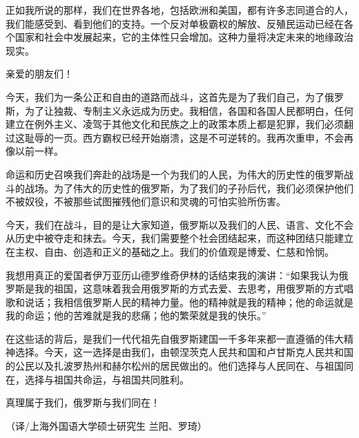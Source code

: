 \documentclass[UTF8, 11pt, oneside]{ctexart}
\begin{document}
正如我所说的那样，我们在世界各地，包括欧洲和美国，都有许多志同道合的人，我们能感受到、看到他们的支持。一个反对单极霸权的解放、反殖民运动已经在各个国家和社会中发展起来，它的主体性只会增加。这种力量将决定未来的地缘政治现实。

亲爱的朋友们！

今天，我们为一条公正和自由的道路而战斗，这首先是为了我们自己，为了俄罗斯，为了让独裁、专制主义永远成为历史。我相信，各国和各国人民都明白，任何建立在例外主义、凌驾于其他文化和民族之上的政策本质上都是犯罪，我们必须翻过这耻辱的一页。西方霸权已经开始崩溃，这是不可逆转的。我再次重申，不会再像以前一样。

命运和历史召唤我们奔赴的战场是一个为我们的人民，为伟大的历史性的俄罗斯战斗的战场。为了伟大的历史性的俄罗斯，为了我们的子孙后代，我们必须保护他们不被奴役，不被那些试图摧残他们意识和灵魂的可怕实验所伤害。

今天，我们在战斗，目的是让大家知道，俄罗斯以及我们的人民、语言、文化不会从历史中被夺走和抹去。今天，我们需要整个社会团结起来，而这种团结只能建立在主权、自由、创造和正义的基础之上。我们的价值观是博爱、仁慈和怜悯。

我想用真正的爱国者伊万亚历山德罗维奇伊林的话结束我的演讲：“如果我认为俄罗斯是我的祖国，这意味着我会用俄罗斯的方式去爱、去思考，用俄罗斯的方式唱歌和说话；我相信俄罗斯人民的精神力量。他的精神就是我的精神；他的命运就是我的命运；他的苦难就是我的悲痛；他的繁荣就是我的快乐。”

在这些话的背后，是我们一代代祖先自俄罗斯建国一千多年来都一直遵循的伟大精神选择。今天，这一选择是由我们，由顿涅茨克人民共和国和卢甘斯克人民共和国的公民以及扎波罗热州和赫尔松州的居民做出的。他们选择与人民同在、与祖国同在，选择与祖国共命运，与祖国共同胜利。

真理属于我们，俄罗斯与我们同在！

（译/上海外国语大学硕士研究生 兰阳、罗琦）
\end{document}
